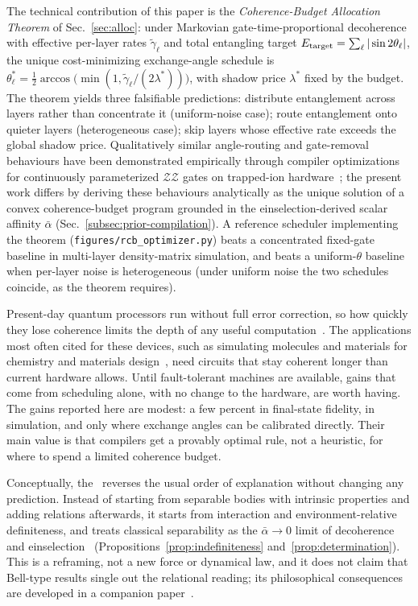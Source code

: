 The technical contribution of this paper is the
\emph{Coherence-Budget Allocation Theorem} of
Sec.~\ref{sec:alloc}: under Markovian gate-time-proportional
decoherence with effective per-layer rates $\tilde\gamma_\ell$ and
total entangling target
$E_{\rm target} = \sum_\ell |\sin 2\theta_\ell|$, the unique
cost-minimizing exchange-angle schedule is
$\theta_\ell^\ast = \tfrac{1}{2}\arccos\bigl(\min(1,\tilde\gamma_\ell/(2\lambda^\ast))\bigr)$,
with shadow price $\lambda^\ast$ fixed by the budget.
The theorem yields three falsifiable predictions: distribute
entanglement across layers rather than concentrate it (uniform-noise
case); route entanglement onto quieter layers (heterogeneous case);
skip layers whose effective rate exceeds the global shadow price.
Qualitatively similar angle-routing and gate-removal behaviours have
been demonstrated empirically through compiler optimizations for
continuously parameterized $\mathcal{ZZ}$ gates on trapped-ion
hardware~\cite{Yale2025NoiseAware}; the present work differs by
deriving these behaviours analytically as the unique solution of a
convex coherence-budget program grounded in the einselection-derived
scalar affinity $\bar\alpha$ (Sec.~\ref{subsec:prior-compilation}).
A reference scheduler implementing the theorem
(\texttt{figures/\allowbreak rcb\_\allowbreak optimizer.py}) beats a concentrated fixed-gate
baseline in multi-layer density-matrix simulation, and beats a
uniform-$\theta$ baseline when per-layer noise is heterogeneous (under
uniform noise the two schedules coincide, as the theorem requires).

Present-day quantum processors run without full error correction, so
how quickly they lose coherence limits the depth of any useful
computation~\cite{Preskill2018NISQ}.
The applications most often cited for these devices, such as
simulating molecules and materials for chemistry and materials
design~\cite{Bauer2020ChemRev}, need circuits that stay coherent longer
than current hardware allows.
Until fault-tolerant machines are available, gains that come from
scheduling alone, with no change to the hardware, are worth having.
The gains reported here are modest: a few percent in final-state
fidelity, in simulation, and only where exchange angles can be
calibrated directly.
Their main value is that compilers get a provably optimal rule, not a
heuristic, for where to spend a limited coherence budget.

Conceptually, the \RCF~reverses the usual order of explanation without
changing any prediction.
Instead of starting from separable bodies with intrinsic properties and
adding relations afterwards, it starts from interaction and
environment-relative definiteness, and treats classical separability as
the $\bar\alpha \to 0$ limit of decoherence and
einselection~\cite{Zurek2003,Schlosshauer2005}
(Propositions~\ref{prop:indefiniteness} and~\ref{prop:determination}).
This is a reframing, not a new force or dynamical law, and it does not
claim that Bell-type results single out the relational reading; its
philosophical consequences are developed in a companion
paper~\cite{Adams2026Philosophy}.

